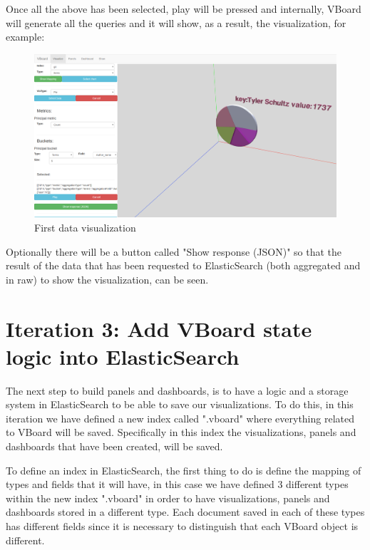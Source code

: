 \documentclass[a4paper, 12pt]{book}
\begin{document}
Once all the above has been selected, play will be pressed and internally, VBoard will generate all the queries and it will show, as a result, the visualization, for example:

\begin{figure}[H]
  \centering
  \includegraphics[width=16cm, keepaspectratio]{img/development/firstdatavisualization}
  \caption{First data visualization}
  \label{fig:firsdatavisualization}
\end{figure}

Optionally there will be a button called "Show response (JSON)" so that the result of the data that has been requested to ElasticSearch (both aggregated and in raw) to show the visualization, can be seen.


\section{Iteration 3: Add VBoard state logic into ElasticSearch}

The next step to build panels and dashboards, is to have a logic and a storage system in ElasticSearch to be able to save our visualizations. To do this, in this iteration we have defined a new index called ".vboard" where everything related to VBoard will be saved. Specifically in this index the visualizations, panels and dashboards that have been created, will be saved.

To define an index in ElasticSearch, the first thing to do is define the mapping of types and fields that it will have, in this case we have defined 3 different types within the new index ".vboard" in order to have visualizations, panels and dashboards stored in a different type. Each document saved in each of these types has different fields since it is necessary to distinguish that each VBoard object is different.
\end{document}
